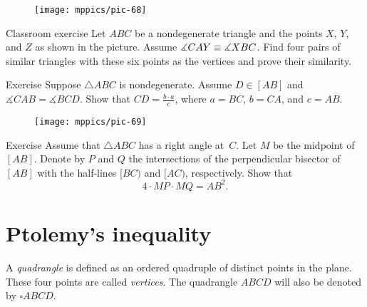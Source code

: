 {

\begin{wrapfigure}{r}{25mm}
\vskip-6mm
\centering
\texttt{[image: mppics/pic-68]}
\end{wrapfigure}


\begin{thm}{Classroom exercise}\label{ex:two-pairs-sim}
Let $ABC$ be a nondegenerate triangle and the points $X$, $Y$, and $Z$ as shown in the picture.
Assume $\measuredangle CAY\equiv\measuredangle XBC$.
Find four pairs of similar triangles with these six points as the vertices
and prove their similarity.
\end{thm}

}

\begin{thm}{Exercise}\label{ex:ABC+D}
Suppose $\triangle ABC$ is nondegenerate.
Assume $D\in [AB]$ and $\measuredangle CAB=\measuredangle BCD$.
Show that $CD=\tfrac{b\cdot a}c$, where $a=BC$, $b=CA$, and $c=AB$. 
\end{thm}

{

\begin{wrapfigure}{r}{25mm}
\vskip-4mm
\centering
\texttt{[image: mppics/pic-69]}
\end{wrapfigure}

\begin{thm}{Exercise}\label{ex:right-perp-bi}
Assume that $\triangle ABC$ has a right angle at~$C$.
Let $M$ be the midpoint of $[AB]$.
Denote by $P$ and $Q$ the intersections of the perpendicular bisector of $[AB]$ with the half-lines
$[BC)$ and $[AC)$, respectively.
Show that
\[
4\cdot MP\cdot MQ = AB^2.
\]

\end{thm}


}



\section{Ptolemy's inequality}

A \emph{quadrangle} is defined as an ordered quadruple of distinct points in the plane.
These four points are called \emph{vertices}.
The quadrangle $ABCD$ will also be denoted by $\square ABCD$.

